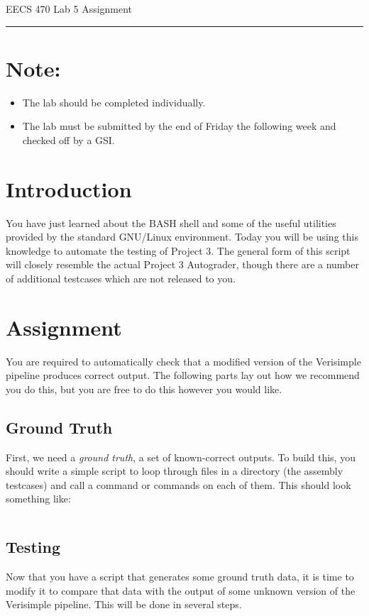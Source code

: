 \documentclass[dvipsnames]{article}
\newcommand{\shortbar}{
	\vspace*{-12pt}
	\begin{center}
		\rule{5ex}{0.1pt}
	\end{center}
}
\newcommand{\lab}[1]{
	\begin{center}
		\LARGE{
			\vspace*{-32pt}
			EECS 470 Lab #1 Assignment
			\shortbar
			\vspace*{-20pt}
		}
	\end{center}
}
\begin{document}
\lab{5}

\section*{Note:}
\begin{itemize}
	\item The lab should be completed individually.
	\item The lab must be submitted by the end of Friday the
		following week and checked off by a GSI.
\end{itemize}

\section{Introduction}
You have just learned about the BASH shell and some of the useful utilities
provided by the standard GNU/Linux environment. Today you will be using this
knowledge to automate the testing of Project 3. The general form of this script
will closely resemble the actual Project 3 Autograder, though there are a number
of additional testcases which are not released to you.

\section{Assignment}
You are required to automatically check that a modified version of the
Verisimple pipeline produces correct output. The following parts lay out how we 
recommend you do this, but you are free to do this however you would like.

\subsection{Ground Truth}
\label{sec:truth}
First, we need a \emph{ground truth}, a set of known-correct outputs. To build
this, you should write a simple script to loop through files in a directory (the
assembly testcases) and call a  command or commands on each of them. This should
look something like:

\inputminted[frame=lines]{bash}{scripts/ground-truth-skeleton.sh}

\subsection{Testing}
Now that you have a script that generates some ground truth data, it is time to
modify it to compare that data with the output of some unknown version of the
Verisimple pipeline. This will be done in several steps.
\end{document}
